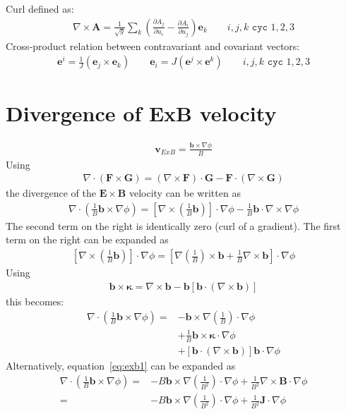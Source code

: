 \documentclass[12pt]{article}
\newcommand{\ve}[1]{\ensuremath{\boldsymbol{#1}}}
\begin{document}
%
Curl defined as:
%
\begin{align*}
\nabla\times\mathbf{A} = \frac{1}{\sqrt{g}}\sum_k\left(\frac{\partial
A_j}{\partial u_i} - \frac{\partial A_i}{\partial u_j}\right)\ve{e}_k \qquad
i,j,k \texttt{ cyc } 1,2,3
\end{align*}
%
Cross-product relation between contravariant and covariant vectors:
%
\begin{align*}
\ve{e}^i = \frac{1}{J}\left(\ve{e}_j \times \ve{e}_k\right) \qquad \ve{e}_i =
J\left(\ve{e}^j \times \ve{e}^k\right) \qquad i,j,k \texttt{ cyc } 1,2,3
\end{align*}
%





\section{Divergence of ExB velocity}
%
\begin{align*}
\ve{v}_{ExB} = \frac{\ve{b}\times\nabla\phi}{B}
\end{align*}
%
Using
%
\begin{align*}
\nabla\cdot\left(\ve{F}\times\ve{G}\right) =
\left(\nabla\times\ve{F}\right)\cdot\ve{G} -
\ve{F}\cdot\left(\nabla\times\ve{G}\right)
\end{align*}
%
the divergence of the $\ve{E}\times\ve{B}$ velocity can be written as
%
\begin{align}
\nabla\cdot\left(\frac{1}{B}\ve{b}\times\nabla\phi\right) =
\left[\nabla\times\left(\frac{1}{B}\ve{b}\right)\right]\cdot\nabla\phi -
\frac{1}{B}\ve{b}\cdot\nabla\times\nabla\phi
\label{eq:exb1}
\end{align}
%
The second term on the right is identically zero (curl of a gradient). The
first term on the right can be expanded as
%
\begin{align*}
\left[\nabla\times\left(\frac{1}{B}\ve{b}\right)\right]\cdot\nabla\phi =
\left[\nabla\left(\frac{1}{B}\right)\times\ve{b} +
\frac{1}{B}\nabla\times\ve{b}\right]\cdot\nabla\phi
\end{align*}
%
Using
%
\begin{align*}
\ve{b}\times\ve{\kappa} = \nabla\times\ve{b} -
\ve{b}\left[\ve{b}\cdot\left(\nabla\times\ve{b}\right)\right]
\end{align*}
%
this becomes:
%
\begin{align*}
  \nabla\cdot\left(\frac{1}{B}\ve{b}\times\nabla\phi\right) =
  &-\ve{b}\times\nabla\left(\frac{1}{B}\right)\cdot\nabla\phi \\ &+
  \frac{1}{B}\ve{b}\times\ve{\kappa}\cdot\nabla\phi \\ &+
  \left[\ve{b}\cdot\left(\nabla\times\ve{b}\right)\right]\ve{b}\cdot\nabla\phi
\end{align*}
%
Alternatively, equation~\ref{eq:exb1} can be expanded as
%
\begin{align*}
  \nabla\cdot\left(\frac{1}{B}\ve{b}\times\nabla\phi\right) =&
    -B\ve{b}\times\nabla\left(\frac{1}{B^2}\right)\cdot\nabla\phi +
    \frac{1}{B^2}\nabla\times\ve{B}\cdot\nabla\phi \\ =&
    -B\ve{b}\times\nabla\left(\frac{1}{B^2}\right)\cdot\nabla\phi +
    \frac{1}{B^2}\ve{J}\cdot\nabla\phi
\end{align*}
%
\end{document}
